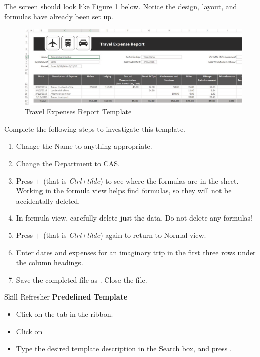 The screen should look like Figure \ref{06:fig09} below. Notice the design, layout, and formulas have already been set up.

\begin{figure}[H]
	\centering
	\includegraphics[width=\maxwidth{.95\linewidth}]{gfx/ch06_fig09}
	\caption{Travel Expenses Report Template}
	\label{06:fig09}
\end{figure}

Complete the following steps to investigate this template.

\begin{enumerate}
	\item Change the Name to anything appropriate.
	\item Change the Department to CAS.
	\item Press $+$\fmtKeystroke{$ \sim $} (that is \textit{Ctrl+tilde}) to see where the formulas are in the sheet. Working in the formula view helps find formulas, so they will not be accidentally deleted.
	\item In formula view, carefully delete just the data. Do not delete any formulas!
	\item Press $+$\fmtKeystroke{$ \sim $} (that is \textit{Ctrl+tilde}) again to return to Normal view.
	\item Enter dates and expenses for an imaginary trip in the first three rows under the column headings.
	\item Save the completed file as . Close the file.
\end{enumerate}

\begin{center}
	\begin{sklbox}{Skill Refresher}
		\textbf{Predefined Template}
		\\
		\begin{itemize}
			\setlength{\itemsep}{0pt}
			\setlength{\parskip}{0pt}
			\setlength{\parsep}{0pt}

			\item Click on the  tab in the ribbon.
			\item Click on 
			\item Type the desired template description in the Search box, and press .
			
		\end{itemize}
	\end{sklbox}
\end{center}

